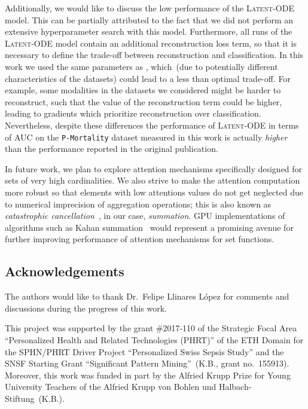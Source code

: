 \documentclass{article}
\newcommand{\dataset}[1]{\texttt{#1}}
\newcommand{\method}[1]{\textsc{#1}}
\begin{document}
Additionally, we would like to discuss the low performance of the
\method{Latent-ODE} model. This can be partially attributed to the fact that
we did not perform an extensive hyperparameter search with this model.
Furthermore, all runs of the \method{Latent-ODE} model contain an additional
reconstruction loss term, so that it is necessary to define the trade-off
between reconstruction and classification.  In this work we used the same
parameters as \citet{rubanova2019latent}, which~(due to potentially different
characteristics of the datasets) could lead to a less than optimal trade-off.
For example, some modalities in the datasets we considered might be harder to
reconstruct, such that the value of the reconstruction term could be higher,
leading to gradients which prioritize reconstruction over classification.
Nevertheless, despite these differences the performance of \method{Latent-ODE}
in terms of AUC on the \dataset{P-Mortality} dataset measured in this work is
actually \emph{higher} than the performance reported in the original publication.

In future work, we plan to explore attention mechanisms specifically designed
for sets of very high cardinalities. We also strive to make the attention
computation more robust so that elements with low attentions values do not get
neglected due to numerical imprecision of aggregation operations; this is also
known as \emph{catastrophic cancellation}~\citep{Knuth98}, in our case,
\emph{summation}.
GPU implementations of algorithms such as Kahan summation~\citep{Kahan65} would
represent a promising avenue for further improving performance of attention
mechanisms for set functions.

\subsection*{Acknowledgements}
The authors would like to thank Dr.\ Felipe Llinares López for comments and
discussions during the progress of this work.

This project was supported by the grant \#2017‐110 of the Strategic
Focal Area ``Personalized Health and Related Technologies (PHRT)'' of
the ETH Domain for the SPHN/PHRT Driver Project ``Personalized Swiss
Sepsis Study'' and  the SNSF Starting Grant ``Significant Pattern
Mining''~(K.B., grant no.~155913).
Moreover, this work was funded in part by the Alfried Krupp Prize for Young
University Teachers of the Alfried Krupp von Bohlen und
Halbach-Stiftung~(K.B.).



\end{document}
